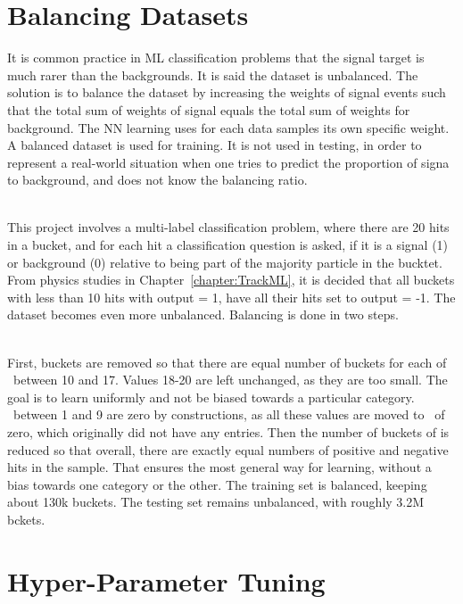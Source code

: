 \section{Balancing Datasets}
\label{sec:BalancingDatasets}

It is common practice in ML classification problems that the signal target is much rarer than the backgrounds. It is said the dataset is unbalanced. The solution is to balance the dataset by increasing the weights of signal events such that the total sum of weights of signal equals the total sum of weights for background. The NN learning uses for each data samples its own specific weight. A balanced dataset is used for training. It is not used in testing, in order to represent a real-world situation when one tries to predict the proportion of signa to background, and does not know the balancing ratio. 

\ \\This project involves a multi-label classification problem, where there are 20 hits in a bucket, and for each hit a classification question is asked, if it is a signal (1) or background (0) relative to being part of the majority particle in the bucktet. From physics studies in Chapter~\ref{chapter:TrackML}, it is decided that all buckets with less than 10 hits with output = 1, have all their hits set to output = -1. The dataset becomes even more unbalanced. Balancing is done in two steps.

\ \\First, buckets are removed so that there are equal number of buckets for each of \nbPositiveHit\ between 10 and 17. Values 18-20 are left unchanged, as they are too small. The goal is to learn uniformly and not be biased towards a particular category. \nbPositiveHit~between 1 and 9 are zero by constructions, as all these values are moved to \nbPositiveHit~of zero, which originally did not have any entries. Then the number of buckets of  is reduced so that overall, there are exactly equal numbers of positive and negative hits in the sample. That ensures the most general way for learning, without a bias towards one category or the other. The training set is balanced, keeping about 130k buckets. The testing set remains unbalanced, with roughly 3.2M bckets.

\section{Hyper-Parameter Tuning}
\label{sec:HyperparameterTuning}

